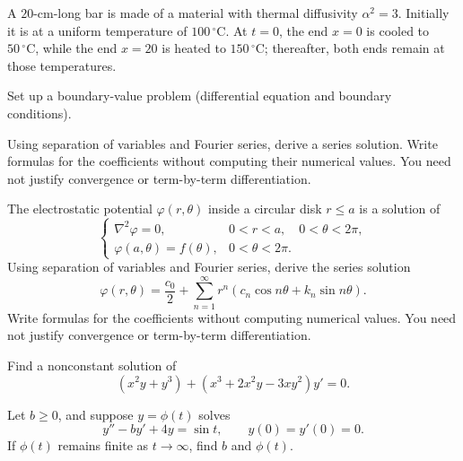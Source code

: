 \documentclass[11pt,oneside]{article}
\begin{document}
\begin{problem}
A $20$-cm-long bar is made of a material with thermal diffusivity $\alpha^2=3$. Initially it is at a uniform temperature of $100\,{}^\circ\mathrm C$. At $t=0$, the end $x=0$ is cooled to $50\,{}^\circ\mathrm C$, while the end $x=20$ is heated to $150\,{}^\circ\mathrm C$; thereafter, both ends remain at those temperatures.
\begin{problemsubparts}
\item Set up a boundary-value problem (differential equation and boundary conditions).
\item Using separation of variables and Fourier series, derive a series solution. Write formulas for the coefficients without computing their numerical values. You need not justify convergence or term-by-term differentiation.
\end{problemsubparts}
\end{problem}

\begin{problem}
The electrostatic potential $\varphi(r,\theta)$ inside a circular disk $r\le a$ is a solution of
\[\begin{cases}\nabla^2\varphi=0,&0<r<a,\quad 0<\theta<2\pi,\\\varphi(a,\theta)=f(\theta),&0<\theta<2\pi.\end{cases}\]
Using separation of variables and Fourier series, derive the series solution
\[\varphi(r,\theta)=\frac{c_0}{2}+\sum_{n=1}^{\infty}r^n(c_n\cos n\theta+k_n\sin n\theta).\]
Write formulas for the coefficients without computing numerical values. You need not justify convergence or term-by-term differentiation.
\end{problem}


\begin{problem}
Find a nonconstant solution of
\[
(x^2y+y^3)+(x^3+2x^2y-3xy^2)y'=0.
\]
\end{problem}

\begin{problem}
Let $b\ge0$, and suppose $y=\phi(t)$ solves
\[
y''-by'+4y=\sin t,\qquad y(0)=y'(0)=0.
\]
If $\phi(t)$ remains finite as $t\to\infty$, find $b$ and $\phi(t)$.
\end{problem}
\end{document}
